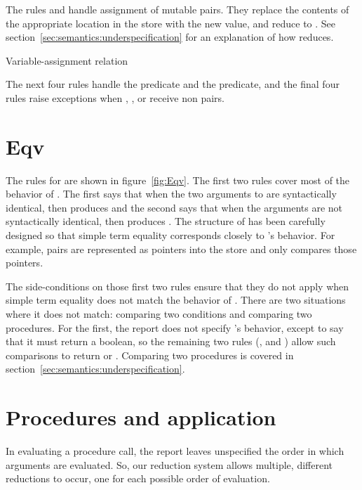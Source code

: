 The rules  and  handle assignment of mutable pairs. 
They replace the contents of the appropriate location in the store with the new value, and reduce to . See section~\ref{sec:semantics:underspecification} for an explanation of how  reduces.

\beginfig
\subfigureadjust{}
\begin{center}

\end{center}
\caption{Variable-assignment relation}\label{fig:varsetd}
\endfig

The next four rules handle the  predicate and the  predicate, and the final four rules raise exceptions when , ,  or  receive non pairs.

\section{Eqv}

The rules for  are shown in figure~\ref{fig:Eqv}. The first two rules cover most of the behavior of . 
The first says that when the two arguments to  are syntactically identical, then  produces \semtrue{} and the second says that when the arguments are not syntactically identical, then  produces \semfalse{}. 
The structure of  has been carefully designed so that simple term equality corresponds closely to 's behavior. 
For example, pairs are represented as pointers into the store and  only compares those pointers.

The side-conditions on those first two rules ensure that they do not apply when simple term equality does not match the behavior of . There are two situations where it does not match: comparing two conditions and comparing two procedures. For the first, the report does not specify 's behavior, except to say that it must return a boolean, so the remaining two rules (, and ) allow such comparisons to return \semtrue{} or \semfalse{}. Comparing two procedures is covered in section~\ref{sec:semantics:underspecification}. 

\section{Procedures and application}

In evaluating a procedure call, the report leaves
unspecified the order in which arguments are evaluated. So, our reduction system allows multiple, different reductions to occur, one for each possible order of evaluation.

